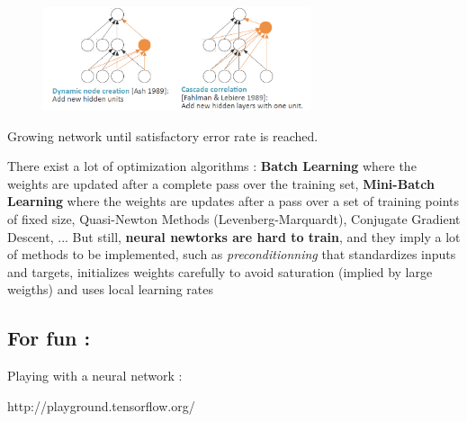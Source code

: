 \documentclass[a4paper,12pt]{article}
\begin{document}
\begin{figure}[!ht]
\centerline{\includegraphics[width=0.7\textwidth]{./figures/growing_netw.png}}
\end{figure}
\centerline{\footnotesize{Growing network until satisfactory error rate is reached.}}

\vspace{0.1in}

\indent
There exist a lot of optimization algorithms : {\bfseries Batch Learning} where the weights are updated after a complete pass over the training set, {\bfseries Mini-Batch Learning} where the weights are updates after a pass over a set of training points of fixed size, Quasi-Newton Methods (Levenberg-Marquardt), Conjugate Gradient Descent, ... But still, {\bfseries neural newtorks are hard to train}, and they imply a lot of methods to be implemented, such as {\itshape preconditionning} that standardizes inputs and targets, initializes weights carefully to avoid saturation (implied by large weigths) and uses local learning rates

\subsection{For fun :}

Playing with a neural network : 
\vspace{0.1in}
\centerline{http://playground.tensorflow.org/}
\vspace{0.1in}
\end{document}
